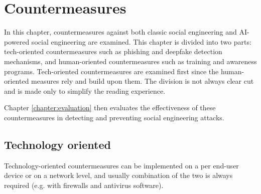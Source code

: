 


\chapter{Countermeasures\label{chapter:countermeasures}}

\begin{comment}

Guides:
    - 

TODO:
    [ ] 

What to cover:
    - AI monitoring content and informing the user if something they are about to share could be used against them or their organization?
    - AI generated training content suited to the personality of the user
    - Policies and EU etc regulations about the development of AI tech
    
Literature:
    - 

\end{comment}

In this chapter, countermeasures against both classic social engineering and AI-powered social engineering are examined. This chapter is divided into two parts: tech-oriented countermeasures such as phishing and deepfake detection mechanisms, and human-oriented countermeasures such as training and awareness programs. Tech-oriented countermeasures are examined first since the human-oriented measures rely and build upon them. The division is not always clear cut and is made only to simplify the reading experience.

Chapter \ref{chapter:evaluation} then evaluates the effectiveness of these countermeasures in detecting and preventing social engineering attacks.


\section{Technology oriented}

\begin{comment}    
    - Deepfake content detection
    - Spear phishing detection
\end{comment}

Technology-oriented countermeasures can be implemented on a per end-user device or on a network level, and usually combination of the two is always required (e.g. with firewalls and antivirus software).

